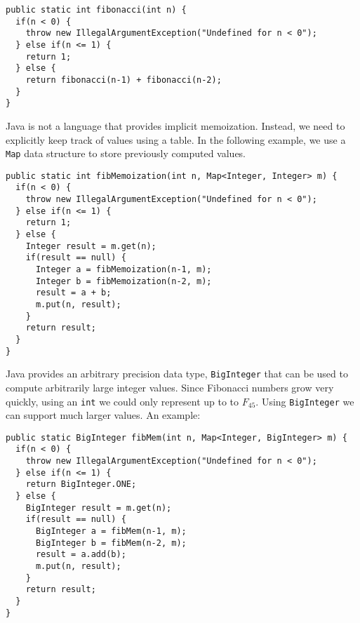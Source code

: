 \begin{verbatim}
public static int fibonacci(int n) {
  if(n < 0) {
    throw new IllegalArgumentException("Undefined for n < 0");
  } else if(n <= 1) {
    return 1;
  } else {
    return fibonacci(n-1) + fibonacci(n-2);
  }
}
\end{verbatim}

Java is not a language that provides implicit memoization.  Instead, 
we need to explicitly keep track of values using a table.  In the 
following example, we use a \texttt{Map} data structure
to store previously computed values.

\begin{verbatim}
public static int fibMemoization(int n, Map<Integer, Integer> m) {
  if(n < 0) {
    throw new IllegalArgumentException("Undefined for n < 0");
  } else if(n <= 1) {
    return 1;
  } else {
    Integer result = m.get(n);
    if(result == null) {
      Integer a = fibMemoization(n-1, m);
      Integer b = fibMemoization(n-2, m);
      result = a + b;
      m.put(n, result);
    }
    return result;
  }
}
\end{verbatim}

Java provides an arbitrary precision data type, \texttt{BigInteger}
that can be used to compute arbitrarily large integer values.  Since
Fibonacci numbers grow very quickly, using an \texttt{int} we could
only represent up to to $F_{45}$.  Using \texttt{BigInteger} we
can support much larger values.  An example:

\begin{verbatim}
public static BigInteger fibMem(int n, Map<Integer, BigInteger> m) {
  if(n < 0) {
    throw new IllegalArgumentException("Undefined for n < 0");
  } else if(n <= 1) {
    return BigInteger.ONE;
  } else {
    BigInteger result = m.get(n);
    if(result == null) {
      BigInteger a = fibMem(n-1, m);
      BigInteger b = fibMem(n-2, m);
      result = a.add(b);
      m.put(n, result);
    }
    return result;
  }
}  
\end{verbatim}




